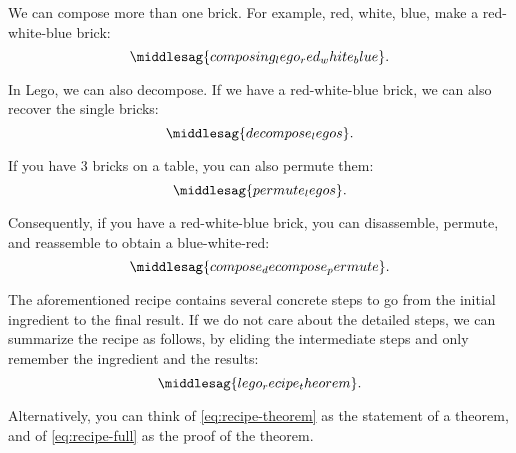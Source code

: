 We can compose more than one brick.
For example, red, white, blue, make a red-white-blue brick:
%
\begin{equation*}
    \middlesag{composing_lego_red_white_blue}.
\end{equation*}

In Lego, we can also decompose.
If we have a red-white-blue brick, we can also recover the single bricks:
%
\begin{equation*}
    \middlesag{decompose_legos}.
\end{equation*}

If you have 3 bricks on a table, you can also permute them:
%
\begin{equation*}
    \middlesag{permute_legos}.
\end{equation*}

Consequently, if you have a red-white-blue brick, you can disassemble, permute, and reassemble to obtain a blue-white-red:
%
\begin{equation}
    \label{eq:recipe-full}
    \middlesag{compose_decompose_permute}.
\end{equation}

The aforementioned recipe contains several concrete steps to go from the initial ingredient to the final result.
If we do not care about the detailed steps, we can summarize the recipe as follows, by eliding the intermediate steps and only remember the ingredient and the results:
%
\begin{equation}
    \label{eq:recipe-theorem}
    \middlesag{lego_recipe_theorem}.
\end{equation}

Alternatively, you can think of \cref{eq:recipe-theorem} as the statement of a theorem, and of \cref{eq:recipe-full} as the proof of the theorem.


